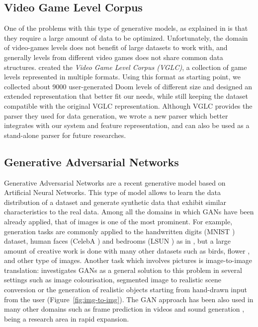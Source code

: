 \subsection{Video Game Level Corpus}
One of the problems with this type of generative models, as explained in \cite{PCGML} is that they require a large amount of data to be optimized. Unfortunately, the domain of video-games levels does not benefit of large datasets to work with, and generally levels from different video games does not share common data structures. \citeauthor{VGLC} created the \textit{Video Game Level Corpus (VGLC)}, a collection of game levels represented in multiple formats. Using this format as starting point, we collected about 9000 user-generated Doom levels of different size and designed an extended representation that better fit our needs, while still keeping the dataset compatible with the original VGLC representation. Although VGLC provides the parser they used for data generation, we wrote a new parser which better integrates with our system and feature representation, and can also be used as a stand-alone parser for future researches.

\subsection{Generative Adversarial Networks}
Generative Adversarial Networks are a recent generative model based on Artificial Neural Networks. This type of model allows to learn the data distribution of a dataset and generate synthetic data that exhibit similar characteristics to the real data. Among all the domains in which GANs have been already applied, that of images is one of the most prominent. For example, generation tasks are commonly applied to the handwritten digits (MNIST \cite{dataset:MNIST}) dataset, human faces (CelebA \cite{dataset:celebA}) and bedrooms (LSUN \cite{dataset:LSUN}) as in \cite{gan:dcgan}, but a large amount of creative work is done with many other datasets such as birds, flower \cite{gan:birds}, and other type of images. Another task which involves pictures is image-to-image translation: \citeauthor{image-to-image} investigates GANs as a general solution to this problem in several settings \cite{image-to-image} such as image colourisation, segmented image to realistic scene conversion or  the generation of realistic objects starting from hand-drawn input from the user (Figure~\ref{fig:img-to-img}). The GAN approach has been also used in many other domains such as frame prediction in videos \cite{gan:frameprediction} and sound generation \cite{gan:sound}, being a research area in rapid expansion.


